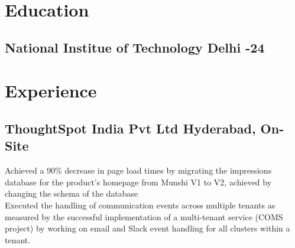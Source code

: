\documentclass[]{Nikhil_Kadiyan_Resume}
\begin{document}

\descript{}

\section{Education}
\hrulefill

\subsection{National Institue of Technology Delhi \hfill {}-24}

\sectionsep



\section{Experience} 
\hrulefill

\subsection{ThoughtSpot India Pvt Ltd \hfill \normalfont Hyderabad, On-Site}

\pt Achieved a 90\% decrease in page load times by migrating the impressions database for the product's homepage from Munshi V1 to V2, achieved by changing the schema of the database\\
\pt Executed the handling of communication events across multiple tenants as measured by the successful implementation of a multi-tenant service (COMS project) by working on email and Slack event handling for all clusters within a tenant. \\
\sectionsep
\end{document}
